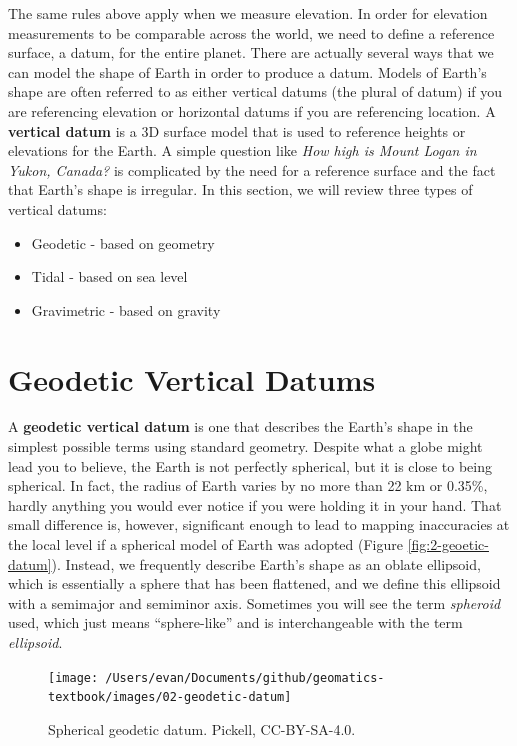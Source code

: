 \documentclass[
]{book}
\providecommand{\tightlist}{%
  \setlength{\itemsep}{0pt}\setlength{\parskip}{0pt}}
\begin{document}
The same rules above apply when we measure elevation. In order for elevation measurements to be comparable across the world, we need to define a reference surface, a datum, for the entire planet. There are actually several ways that we can model the shape of Earth in order to produce a datum. Models of Earth's shape are often referred to as either vertical datums (the plural of datum) if you are referencing elevation or horizontal datums if you are referencing location. A \textbf{vertical datum} is a 3D surface model that is used to reference heights or elevations for the Earth. A simple question like \emph{How high is Mount Logan in Yukon, Canada?} is complicated by the need for a reference surface and the fact that Earth's shape is irregular. In this section, we will review three types of vertical datums:

\begin{itemize}
\tightlist
\item
  Geodetic - based on geometry
\item
  Tidal - based on sea level
\item
  Gravimetric - based on gravity
\end{itemize}

\hypertarget{geodetic-vertical-datums}{%
\section{Geodetic Vertical Datums}\label{geodetic-vertical-datums}}

A \textbf{geodetic vertical datum} is one that describes the Earth's shape in the simplest possible terms using standard geometry. Despite what a globe might lead you to believe, the Earth is not perfectly spherical, but it is close to being spherical. In fact, the radius of Earth varies by no more than 22 km or 0.35\%, hardly anything you would ever notice if you were holding it in your hand. That small difference is, however, significant enough to lead to mapping inaccuracies at the local level if a spherical model of Earth was adopted (Figure \ref{fig:2-geoetic-datum}). Instead, we frequently describe Earth's shape as an oblate ellipsoid, which is essentially a sphere that has been flattened, and we define this ellipsoid with a semimajor and semiminor axis. Sometimes you will see the term \emph{spheroid} used, which just means ``sphere-like'' and is interchangeable with the term \emph{ellipsoid}.

\begin{figure}
\texttt{[image: /Users/evan/Documents/github/geomatics-textbook/images/02-geodetic-datum]} \caption{Spherical geodetic datum. Pickell, CC-BY-SA-4.0.}\label{fig:2-geodetic-datum}
\end{figure}
\end{document}
